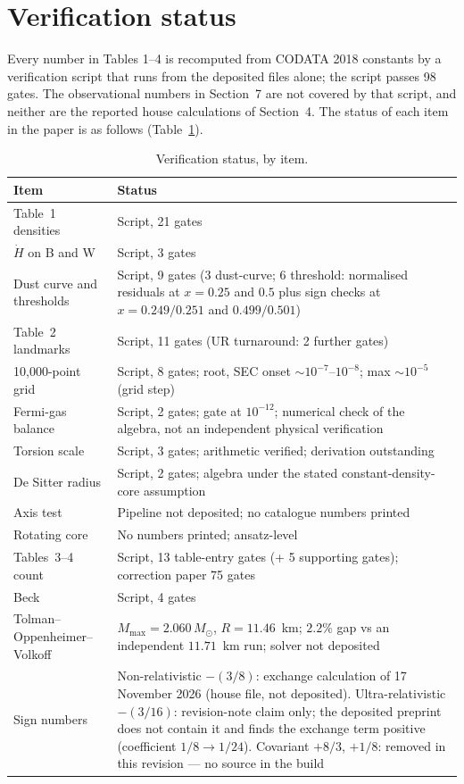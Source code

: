 \documentclass[11pt]{article}
\begin{document}
\section{Verification status}

Every number in Tables 1--4 is recomputed from CODATA 2018 constants by
a verification script that runs from the deposited files alone; the
script passes 98 gates. The observational numbers in Section~7 are not
covered by that script, and neither are the reported house calculations
of Section~4. The status of each item in the paper is as follows
(Table~\ref{tab:verify}).

\begin{table}[h]
\centering
\caption{Verification status, by item.}\label{tab:verify}
\begin{tabularx}{\textwidth}{lX}
\toprule
Item & Status \\
\midrule
Table~1 densities & Script, 21 gates \\
$\dot H$ on B and W & Script, 3 gates \\
Dust curve and thresholds & Script, 9 gates (3 dust-curve; 6 threshold: normalised residuals at $x = 0.25$ and $0.5$ plus sign checks at $x = 0.249/0.251$ and $0.499/0.501$) \\
Table~2 landmarks & Script, 11 gates (UR turnaround: 2 further gates) \\
10,000-point grid & Script, 8 gates; root, SEC onset $\sim10^{-7}$--$10^{-8}$; max $\sim10^{-5}$ (grid step) \\
Fermi-gas balance & Script, 2 gates; gate at $10^{-12}$; numerical check of the algebra, not an independent physical verification \\
Torsion scale & Script, 3 gates; arithmetic verified; derivation outstanding \\
De Sitter radius & Script, 2 gates; algebra under the stated constant-density-core assumption \\
Axis test & Pipeline not deposited; no catalogue numbers printed \\
Rotating core & No numbers printed; ansatz-level \\
Tables~3--4 count & Script, 13 table-entry gates (+ 5 supporting gates); correction paper 75 gates \\
Beck & Script, 4 gates \\
Tolman--Oppenheimer--Volkoff & $M_{\max} = 2.060\,M_\odot$, $R = 11.46$~km; $2.2\%$ gap vs an independent $11.71$~km run; solver not deposited \\
Sign numbers & Non-relativistic $-(3/8)$: exchange calculation of 17 November 2026 (house file, not deposited). Ultra-relativistic $-(3/16)$: revision-note claim only; the deposited preprint does not contain it and finds the exchange term positive (coefficient $1/8 \to 1/24$). Covariant $+8/3$, $+1/8$: removed in this revision --- no source in the build \\

\end{tabularx}
\end{table}
\end{document}
